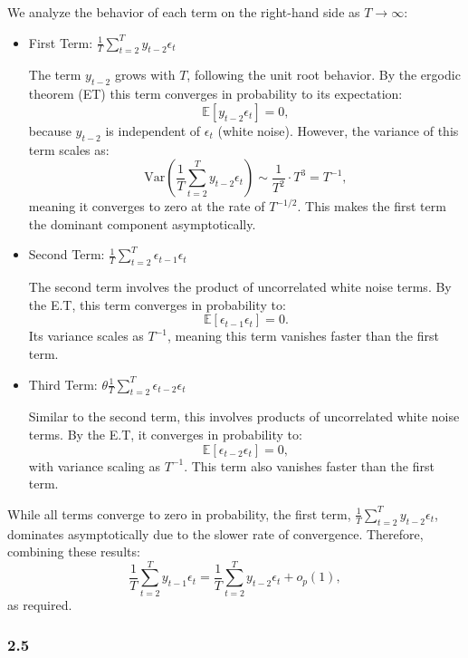\documentclass{article}
\begin{document}
We analyze the behavior of each term on the right-hand side as \( T \to \infty \):

\begin{itemize}
    \item First Term: \( \frac{1}{T} \sum_{t=2}^T y_{t-2} \epsilon_t \)

    The term \( y_{t-2} \) grows with \( T \), following the unit root behavior. By the ergodic theorem (ET) this term converges in probability to its expectation:
    \[
    \mathbb{E}[y_{t-2} \epsilon_t] = 0,
    \]
    because \( y_{t-2} \) is independent of \( \epsilon_t \) (white noise). However, the variance of this term scales as:
    \[
    \text{Var}\left(\frac{1}{T} \sum_{t=2}^T y_{t-2} \epsilon_t\right) \sim \frac{1}{T^2} \cdot T^3 = T^{-1},
    \]
    meaning it converges to zero at the rate of \( T^{-1/2} \). This makes the first term the dominant component asymptotically.

    \item Second Term: \( \frac{1}{T} \sum_{t=2}^T \epsilon_{t-1} \epsilon_t \)

    The second term involves the product of uncorrelated white noise terms. By the E.T, this term converges in probability to:
    \[
    \mathbb{E}[\epsilon_{t-1} \epsilon_t] = 0.
    \]
    Its variance scales as \( T^{-1} \), meaning this term vanishes faster than the first term.

    \item Third Term: \( \theta \frac{1}{T} \sum_{t=2}^T \epsilon_{t-2} \epsilon_t \)

    Similar to the second term, this involves products of uncorrelated white noise terms. By the E.T, it converges in probability to:
    \[
    \mathbb{E}[\epsilon_{t-2} \epsilon_t] = 0,
    \]
    with variance scaling as \( T^{-1} \). This term also vanishes faster than the first term.
\end{itemize}

While all terms converge to zero in probability, the first term, \( \frac{1}{T} \sum_{t=2}^T y_{t-2} \epsilon_t \), dominates asymptotically due to the slower rate of convergence. Therefore, combining these results:
\[
\frac{1}{T} \sum_{t=2}^T y_{t-1} \epsilon_t = \frac{1}{T} \sum_{t=2}^T y_{t-2} \epsilon_t + o_p(1),
\]
as required.

\subsubsection*{2.5}
\end{document}
